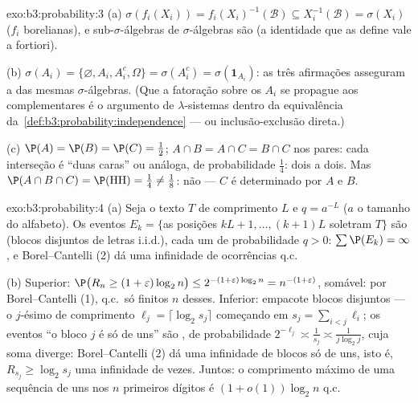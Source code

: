 \begin{solution}{exo:b3:probability:3}
(a) $\sigma(f_i(X_i)) = f_i(X_i)^{-1}(\mathcal B) \subseteq
X_i^{-1}(\mathcal B) = \sigma(X_i)$ ($f_i$ borelianas), e
sub-$\sigma$-álgebras de $\sigma$-álgebras  são
 (a identidade que as define vale a fortiori).

(b) $\sigma(A_i) = \{\varnothing, A_i, A_i^c, \Omega\} =
\sigma(A_i^c) = \sigma(\mathbf 1_{A_i})$: as três
afirmações asseguram a  das mesmas
$\sigma$-álgebras. (Que a fatoração sobre os $A_i$
se propague aos complementares é o argumento de $\lambda$-sistemas
dentro da equivalência da~\cref{def:b3:probability:independence}
--- ou inclusão-exclusão direta.)

(c) $\P(A) = \P(B) = \P(C) = \frac12$; $A\cap B = A\cap C =
B\cap C$ nos pares: cada interseção é ``duas caras'' ou
análoga, de probabilidade $\frac14$:  dois a dois.
Mas $\P(A\cap B\cap C) = \P(\text{HH}) = \frac14 \neq
\frac18$: não  --- $C$ é determinado por $A$ e
$B$.
\end{solution}

\begin{solution}{exo:b3:probability:4}
(a) Seja o texto $T$ de comprimento $L$ e $q = a^{-L}$ ($a$
o tamanho do alfabeto). Os eventos $E_k = \{$as posições $kL+1,
\dots, (k+1)L$ soletram $T\}$ são  (blocos disjuntos
de letras i.i.d.), cada um de probabilidade $q > 0$: $\sum\P(E_k)
= \infty$, e Borel--Cantelli (2) dá uma infinidade de
ocorrências q.c.

(b) Superior: $\P\bigl(R_n \geq (1+\varepsilon)\log_2n\bigr)
\leq 2^{-(1+\varepsilon)\log_2n} = n^{-(1+\varepsilon)}$,
somável: por Borel--Cantelli (1), q.c.\ só finitos
$n$ desses. Inferior: empacote blocos disjuntos --- o $j$-ésimo de
comprimento $\ell_j = \lceil\log_2s_j\rceil$ começando em $s_j =
\sum_{i<j}\ell_i$; os eventos ``o bloco $j$ é só de uns'' são
, de probabilidade $2^{-\ell_j} \asymp
\frac1{s_j} \asymp \frac1{j\log_2 j}$, cuja soma diverge:
Borel--Cantelli (2) dá uma infinidade de blocos só de uns,
isto é, $R_{s_j} \geq \log_2 s_j$ uma infinidade de vezes. Juntos:
o comprimento máximo de uma sequência de uns nos $n$ primeiros dígitos é
$(1 + o(1))\log_2n$ q.c.
\end{solution}

